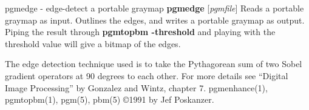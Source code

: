 %

\newpage
%

pgmedge - edge-detect a portable graymap
{\bf pgmedge}
{\rm [}{\it pgmfile}{\rm ]}
Reads a portable graymap as input.
Outlines the edges, and writes a portable graymap as output.
Piping the result through
{\bf pgmtopbm -threshold}
and playing with the
threshold value will give a bitmap of the edges.
\par
The edge detection technique used is to take the Pythagorean sum of
two Sobel gradient operators at 90 degrees to each other.
For more details see ``Digital Image Processing'' by Gonzalez and Wintz,
chapter 7.
pgmenhance(1), pgmtopbm(1), pgm(5), pbm(5)
\copyright 1991 by Jef Poskanzer.
%
 
%

\newpage
%

